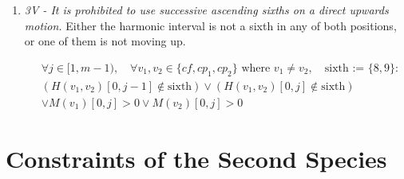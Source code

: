 \begin{enumerate}[wide, label=\bfseries 1.P\arabic*]
    \item  \textit{3V - It is prohibited to use successive ascending sixths on a direct upwards motion.}
    Either the harmonic interval is not a sixth in any of both positions, or one of them is not moving up.

    \begin{equation}
        \begin{aligned}
            & \forall j \in [1, m-1), \quad \forall v_1, v_2 \in \{cf, cp_1, cp_2\} \text{ where } v_1 \neq v_2, \quad \text{sixth := } \{8,9\} \colon \\
            & (H(v_1, v_2)[0, j-1] \notin \text{sixth}) \lor (H(v_1, v_2)[0, j] \notin \text{sixth}) \\
            & \lor M(v_1)[0, j] > 0 \lor M(v_2)[0, j] > 0
        \end{aligned}
        \end{equation}

\end{enumerate}

\section*{Constraints of the Second Species}
